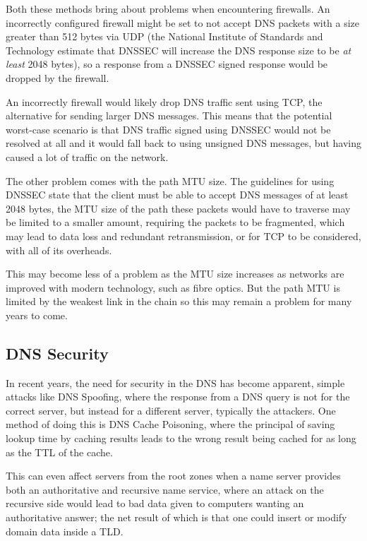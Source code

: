 \documentclass[11pt, a4paper]{article}
\begin{document}
Both these methods bring about problems when encountering firewalls. An 
incorrectly configured firewall might be set to not accept \gls{DNS} packets
with a size greater than 512 bytes via \gls{UDP} (the National Institute of Standards and 
Technology estimate that \gls{DNSSEC} will increase the \gls{DNS} response size
to be \textit{at least} 2048 bytes), so a response from a \gls{DNSSEC} signed 
response would be dropped by the firewall.

An incorrectly firewall would likely drop \gls{DNS} traffic sent using
\gls{TCP}, the alternative for sending larger \gls{DNS} messages. This means
that the potential worst-case scenario is that \gls{DNS} traffic signed using
\gls{DNSSEC} would not be resolved at all and it would fall back to using 
unsigned \gls{DNS} messages, but having caused a lot of traffic on the network.


The other problem comes with the path \gls{MTU} size. The guidelines for using
\gls{DNSSEC} state that the client must be able to accept \gls{DNS} messages of
at least 2048 bytes, the \gls{MTU} size of the path these packets would have to
traverse may be limited to a smaller amount, requiring the packets to be 
fragmented, which may lead to data loss and redundant retransmission, or for 
\gls{TCP} to be considered, with all of its overheads.

This may become less of a problem as the \gls{MTU} size increases as networks
are improved with modern technology, such as fibre optics. But the path 
\gls{MTU} is limited by the weakest link in the chain so this may remain a
problem for many years to come.

\subsection{DNS Security}
\label{subsec:dnssec}
In recent years, the need for security in the \gls{DNS} has become apparent, 
simple attacks like \gls{DNS} Spoofing, where the response from a \gls{DNS}
query is not for the correct server, but instead for a different server, 
typically the attackers. One method of doing this is \gls{DNS} Cache 
Poisoning\cite{davies2008cache}, where the principal of saving lookup time by
caching results leads to the wrong result being cached for as long as the 
\gls{TTL} of the cache. 

This can even affect servers from the root zones when a
name server provides both an authoritative and recursive name service, where an
attack on the recursive side would lead to bad data given to computers wanting 
an authoritative answer; the net result of which is that one could insert or
modify domain data inside a \gls{TLD}. %
\end{document}

